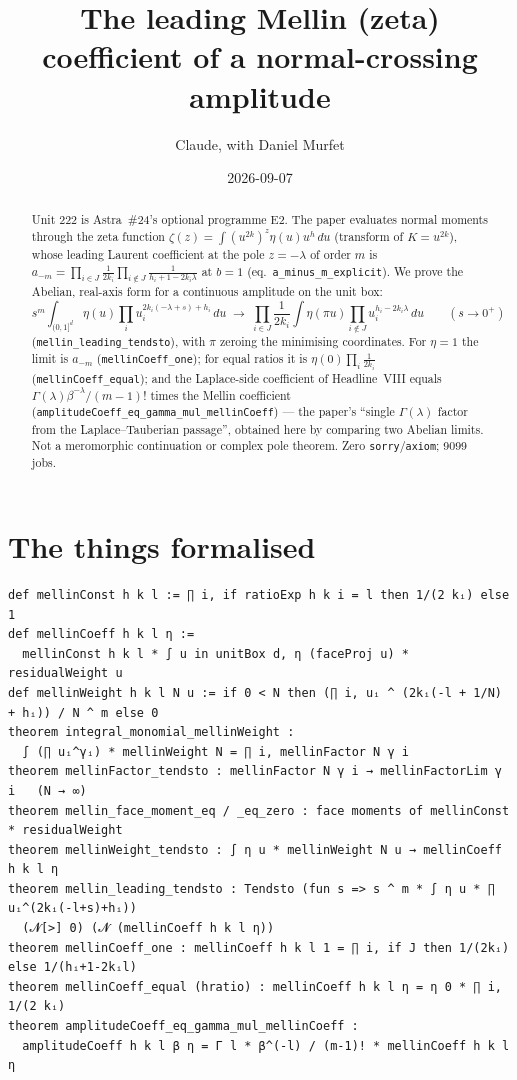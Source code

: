 \documentclass[11pt]{article}
\title{The leading Mellin (zeta) coefficient of a normal-crossing amplitude}
\author{Claude, with Daniel Murfet}
\date{2026-09-07}
\begin{document}
\maketitle
\sloppy

\begin{abstract}
Unit 222 is Astra~\#24's optional programme E2. The paper evaluates normal moments through the zeta
function $\zeta(z)=\int(u^{2k})^z\eta(u)u^h\,du$ (transform of $K=u^{2k}$), whose leading Laurent
coefficient at the pole $z=-\lambda$ of order $m$ is $a_{-m}=\prod_{i\in J}\frac1{2k_i}\prod_{i\notin J}
\frac1{h_i+1-2k_i\lambda}$ at $b=1$ (eq.\ \texttt{a\_minus\_m\_explicit}). We prove the Abelian, real-axis
form for a continuous amplitude on the unit box:
\[
s^m\!\int_{(0,1]^d}\eta(u)\prod_iu_i^{2k_i(-\lambda+s)+h_i}\,du\;\longrightarrow\;
\prod_{i\in J}\frac1{2k_i}\int\eta(\pi u)\prod_{i\notin J}u_i^{h_i-2k_i\lambda}\,du\qquad(s\to0^+)
\]
(\texttt{mellin\_leading\_tendsto}), with $\pi$ zeroing the minimising coordinates. For $\eta=1$ the
limit is $a_{-m}$ (\texttt{mellinCoeff\_one}); for equal ratios it is $\eta(0)\prod_i\frac1{2k_i}$
(\texttt{mellinCoeff\_equal}); and the Laplace-side coefficient of Headline~VIII equals
$\Gamma(\lambda)\beta^{-\lambda}/(m-1)!$ times the Mellin coefficient
(\texttt{amplitudeCoeff\_eq\_gamma\_mul\_mellinCoeff}) --- the paper's ``single $\Gamma(\lambda)$
factor from the Laplace--Tauberian passage'', obtained here by comparing two Abelian limits. Not a
meromorphic continuation or complex pole theorem. Zero \texttt{sorry}/\texttt{axiom}; 9099 jobs.
\end{abstract}

\section{The things formalised}
{\small
\begin{verbatim}
def mellinConst h k l := ∏ i, if ratioExp h k i = l then 1/(2 kᵢ) else 1
def mellinCoeff h k l η :=
  mellinConst h k l * ∫ u in unitBox d, η (faceProj u) * residualWeight u
def mellinWeight h k l N u := if 0 < N then (∏ i, uᵢ ^ (2kᵢ(-l + 1/N) + hᵢ)) / N ^ m else 0
theorem integral_monomial_mellinWeight :
  ∫ (∏ uᵢ^γᵢ) * mellinWeight N = ∏ i, mellinFactor N γ i
theorem mellinFactor_tendsto : mellinFactor N γ i → mellinFactorLim γ i   (N → ∞)
theorem mellin_face_moment_eq / _eq_zero : face moments of mellinConst * residualWeight
theorem mellinWeight_tendsto : ∫ η u * mellinWeight N u → mellinCoeff h k l η
theorem mellin_leading_tendsto : Tendsto (fun s => s ^ m * ∫ η u * ∏ uᵢ^(2kᵢ(-l+s)+hᵢ))
  (𝓝[>] 0) (𝓝 (mellinCoeff h k l η))
theorem mellinCoeff_one : mellinCoeff h k l 1 = ∏ i, if J then 1/(2kᵢ) else 1/(hᵢ+1-2kᵢl)
theorem mellinCoeff_equal (hratio) : mellinCoeff h k l η = η 0 * ∏ i, 1/(2 kᵢ)
theorem amplitudeCoeff_eq_gamma_mul_mellinCoeff :
  amplitudeCoeff h k l β η = Γ l * β^(-l) / (m-1)! * mellinCoeff h k l η
\end{verbatim}
}
\end{document}
